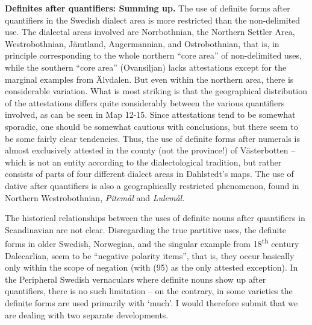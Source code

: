 \textbf{Definites after quantifiers: Summing up. }The use of definite forms after quantifiers in the Swedish dialect area is more restricted than the non-delimited use. The dialectal areas involved are Norrbothnian, the Northern Settler Area, Westrobothnian, Jämtland, Angermannian, and Ostrobothnian, that is, in principle corresponding to the whole northern “core area” of non-delimited uses, while the southern “core area” (Ovansiljan) lacks attestations except for the marginal examples from Älvdalen. But even within the northern area, there is considerable variation. What is most striking is that the geographical distribution of the attestations differs quite considerably between the various quantifiers involved, as can be seen in Map 12{}-15. Since attestations tend to be somewhat sporadic, one should be somewhat cautious with conclusions, but there seem to be some fairly clear tendencies. Thus, the use of definite forms after numerals is almost exclusively attested in the county (not the province!) of Västerbotten – which is not an entity according to the dialectological tradition, but rather consists of parts of four different dialect areas in Dahlstedt’s maps. The use of dative after quantifiers is also a geographically restricted phenomenon, found in Northern Westrobothnian, \textit{Pitemål} and \textit{Lulemål}. 


The historical relationships between the uses of definite nouns after quantifiers in Scandinavian are not clear. Disregarding the true partitive uses, the definite forms in older Swedish, Norwegian, and the singular example from 18\textsuperscript{th} century Dalecarlian, seem to be “negative polarity items”, that is, they occur basically only within the scope of negation (with (95) as the only attested exception). In the Peripheral Swedish vernaculars where definite nouns show up after quantifiers, there is no such limitation – on the contrary, in some varieties the definite forms are used primarily with ‘much’. I would therefore submit that we are dealing with two separate developments. 




